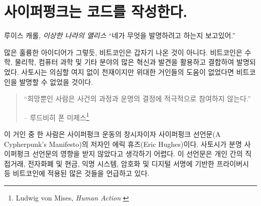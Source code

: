 \chapter{사이퍼펑크는 코드를 작성한다.}
\label{les:20}

\begin{chapquote}
	{루이스 캐롤, \textit{이상한 나라의 앨리스}}
	\enquote{네가 무엇을 발명하려고 하는지 보고있어.}
\end{chapquote}

\begin{comment}
	Like many great ideas, Bitcoin didn't come out of nowhere. It was made
	possible by utilizing and combining many innovations and discoveries in
	mathematics, physics, computer science, and other fields. While
	undoubtedly a genius, Satoshi wouldn't have been able to invent Bitcoin
	without the giants on whose shoulders he was standing on.
\end{comment}
많은 훌륭한 아이디어가 그렇듯, 
비트코인은 갑자기 나온 것이 아니다.
비트코인은 수학, 물리학, 컴퓨터 과학 및 기타 분야의 많은 혁신과 발견을 활용하고 결합하여 발명되었다.
사토시는 의심할 여지 없이 천재이지만 위대한 거인들의 도움이 없었다면 비트코인을 발명할 수 없었을 것이다.

\begin{quotation}\begin{samepage}
		\enquote{희망뿐인 사람은 사건의 과정과 운명의 결정에 적극적으로 참여하지 않는다.}
		\begin{flushright} -- 루드비히 폰 미제스\footnote{Ludwig von Mises, \textit{Human Action} \cite{human-action}}
\end{flushright}\end{samepage}\end{quotation}

\begin{comment}
	One of these giants is Eric Hughes, one of the founders of the cypherpunk
	movement and author of \textit{A Cypherpunk's Manifesto}. It's hard to imagine
	that Satoshi wasn't influenced by this manifesto. It speaks of many things which
	Bitcoin enables and utilizes, such as direct and private transactions,
	electronic money and cash, anonymous systems, and defending privacy with
	cryptography and digital signatures.
\end{comment}
이 거인 중 한 사람은 사이퍼펑크 운동의 창시자이자 사이퍼펑크 선언문(A Cypherpunk's Manifesto)의 저자인 
에릭 휴즈(Eric Hughes)이다.
사토시가 분명 사이퍼펑크 선언문의 영향을 받지 않았다고 생각하기 어렵다.
이 선언문은 개인 간의 직접거래, 전자화폐 및 현금, 익명 시스템, 암호화 및 디지털 서명에 기반한 프라이버시 등 
비트코인에 적용된 많은 것들을 언급하고 있다.

